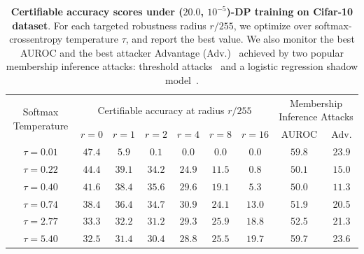     \begin{table}
    \centering
    \small
    \begin{tabular}{|c|cccccc|cc|}
    \hline
      \multirow{3}{4.5em}{\centering Softmax Temperature} & \multicolumn{6}{c|}{\multirow{2}{*}{Certifiable accuracy at radius $r/255$}} &  \multicolumn{2}{c|}{\multirow{2}{7em}{\centering Membership Inference Attacks}}\\
        &       &       &       &       &       &               &       &     \\
        & $r=0$ & $r=1$ & $r=2$ & $r=4$ & $r=8$ & $r=16$        & AUROC & Adv.\\ 
    \hline
    \hline
    $\tau=0.01$ & $\bm{47.4}$ & $5.9$ & $0.1$ & $0.0$ & $0.0$ & $0.0$ & $59.8$ & $23.9$\\
    $\tau=0.22$ & $44.4$ & $\bm{39.1}$ & $34.2$ & $24.9$ & $11.5$ & $0.8$ & $50.1$ & $15.0$\\
    $\tau=0.40$ & $41.6$ & $38.4$ & $\bm{35.6}$ & $29.6$ & $19.1$ & $5.3$ & $50.0$ & $11.3$\\
    $\tau=0.74$ & $38.4$ & $36.4$ & $34.7$ & $\bm{30.9}$ & $24.1$ & $13.0$ & 51.9 & 20.5\\
    $\tau=2.77$ & $33.3$ & $32.2$ & $31.2$ & $29.3$ & $\bm{25.9}$ & $18.8$ & 52.5 & 21.3\\
    $\tau=5.40$ & $32.5$ & $31.4$ & $30.4$ & $28.8$ & $25.5$ & $\bm{19.7}$ & 59.7 & 23.6\\
    \hline
    \end{tabular}
    \caption{\textbf{Certifiable accuracy scores under ($20.0$, $10^{-5}$)-DP training on Cifar-10 dataset}. For each targeted robustness radius $r/255$, we optimize over softmax-crossentropy temperature $\tau$, and report the best value. We also monitor the best AUROC and the best attacker Advantage (Adv.)~\cite{yeom2018privacy} achieved by two popular membership inference attacks: threshold attacks~\cite{song2021systematic} and a logistic regression shadow model~\cite{shokri2017membership}.}
    \label{tab:certificates}
    \end{table}

